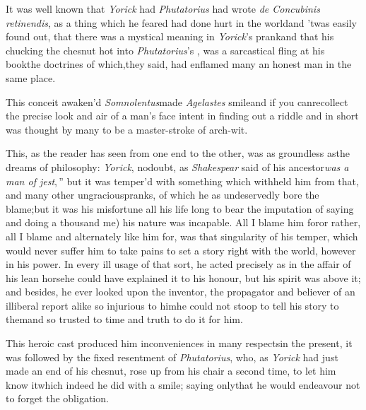 \documentclass{article}
\begin{document}
It was well known that \textit{Yorick} had\break
{}\break
\textit{Phutatorius} had wrote \textit{de Concubinis
retinendis}, as a thing which he feared had done hurt in the
world\tsk and ’twas easily found out, that there was a
mystical meaning in \textit{Yorick}’s prank\tsk and that his
chucking the chesnut hot into \textit{Phutatorius}’s
\hbox{\tsk{}}, 
was a sarcastical fling at his book\tsk the doctrines
of which,\break they said, had enflamed many an honest man in the
same place.

This conceit awaken’d \textit{Somnolentus}\tsh made
\textit{Agelastes} smile\tsk and if you can\break recollect the
precise look and air of a man’s face intent in finding out a
riddle\tsk{} and in short was thought by many to be a master-stroke
of arch-wit.

This, as the reader has seen from one end to the other, was as
groundless as\break the dreams of philosophy: \textit{Yorick}, no\break doubt, as
\textit{Shakespear} said of his ancestor\break\tsk\lqq\textit{was
a man of jest},\,” but it was tem\-per’d with something
which withheld him\break
from that, and many other ungracious\break pranks, of
which he as undeservedly\break
bore the blame;\tsk but it was his
misfortune all his life long to bear the imputation of saying and
doing a thousand  me) his
nature was incapable. All I
blame him for\tsk or rather, all I blame and alternately like him for, was that
singularity of his temper, which would never suffer him to take pains to set a story
right with the world, however in his power. In every ill usage of that sort, he
acted precisely as in the affair of his lean horse\tsk he could have explained it to
his honour, but his spirit was above it; and besides, he ever looked upon the
inventor, the propagator and believer of an illiberal report alike so injurious to
him\tsk he could not stoop to tell his story to them\tsk and so trusted to time and
truth to do it for him.

This heroic cast produced him inconveniences in many
respects\tsk in the pre\-sent, it was followed by the fixed
resentment of \textit{Phutatorius}, who, as \textit{Yorick} had just
made an end of his chesnut, rose up from his chair a second time,
to let him know it\tsk which indeed he did with a smile; saying
only\tsk that he would endeavour not to forget the
obligation.
\end{document}
